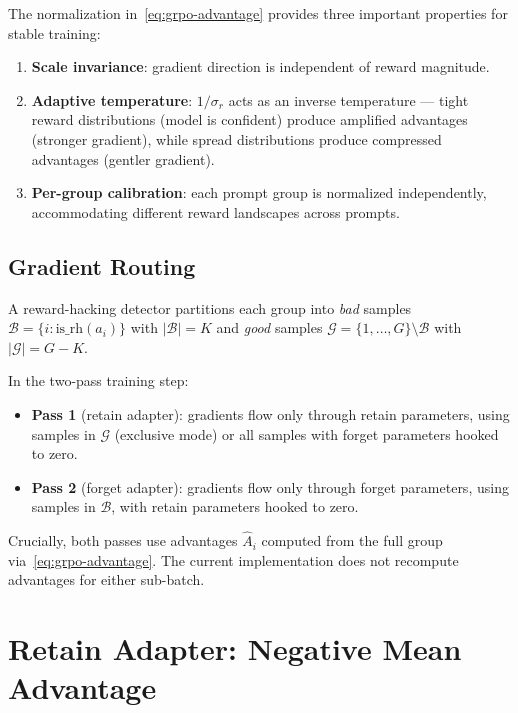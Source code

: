 \documentclass[11pt]{article}
\begin{document}
The normalization in~\eqref{eq:grpo-advantage} provides three important
properties for stable training:
\begin{enumerate}[nosep]
    \item \textbf{Scale invariance}: gradient direction is independent of
        reward magnitude.
    \item \textbf{Adaptive temperature}: $1/\sigma_r$ acts as an inverse
        temperature --- tight reward distributions (model is confident) produce
        amplified advantages (stronger gradient), while spread distributions
        produce compressed advantages (gentler gradient).
    \item \textbf{Per-group calibration}: each prompt group is normalized
        independently, accommodating different reward landscapes across prompts.
\end{enumerate}

\subsection{Gradient Routing}

A reward-hacking detector partitions each group into \emph{bad} samples
$\mathcal{B} = \{i : \text{is\_rh}(a_i)\}$ with $|\mathcal{B}| = K$ and
\emph{good} samples $\mathcal{G} = \{1,\ldots,G\} \setminus \mathcal{B}$
with $|\mathcal{G}| = G - K$.

In the two-pass training step:
\begin{itemize}[nosep]
    \item \textbf{Pass 1} (retain adapter): gradients flow only through retain
        parameters, using samples in $\mathcal{G}$ (exclusive mode) or all
        samples with forget parameters hooked to zero.
    \item \textbf{Pass 2} (forget adapter): gradients flow only through forget
        parameters, using samples in $\mathcal{B}$, with retain parameters
        hooked to zero.
\end{itemize}

Crucially, both passes use advantages $\hat{A}_i$ computed from the full group
via~\eqref{eq:grpo-advantage}. The current implementation does not recompute
advantages for either sub-batch.

\section{Retain Adapter: Negative Mean Advantage}\label{sec:retain}
\end{document}
